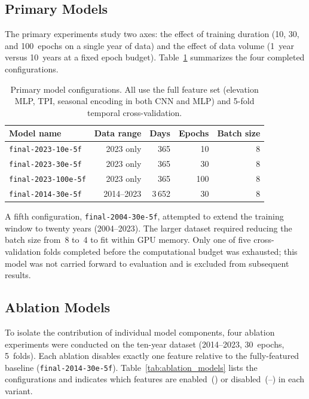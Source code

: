 \subsection{Primary Models}

The primary experiments study two axes: the effect of training duration (10, 30, and 100~epochs on a single year of data) and the effect of data volume (1~year versus 10~years at a fixed epoch budget). Table~\ref{tab:primary_models} summarizes the four completed configurations.

\begin{table}[ht]
\centering
\caption{Primary model configurations. All use the full feature set (elevation MLP, TPI, seasonal encoding in both CNN and MLP) and 5-fold temporal cross-validation.}
\label{tab:primary_models}
\begin{tabular}{@{}lrrrr@{}}
\toprule
\textbf{Model name} & \textbf{Data range} & \textbf{Days} & \textbf{Epochs} & \textbf{Batch size} \\
\midrule
\texttt{final-2023-10e-5f}  & 2023 only    & 365    & 10  & 8 \\
\texttt{final-2023-30e-5f}  & 2023 only    & 365    & 30  & 8 \\
\texttt{final-2023-100e-5f} & 2023 only    & 365    & 100 & 8 \\
\texttt{final-2014-30e-5f}  & 2014--2023   & 3\,652 & 30  & 8 \\
\bottomrule
\end{tabular}
\end{table}

A fifth configuration, \texttt{final-2004-30e-5f}, attempted to extend the training window to twenty years (2004--2023). The larger dataset required reducing the batch size from~8 to~4 to fit within GPU memory. Only one of five cross-validation folds completed before the computational budget was exhausted; this model was not carried forward to evaluation and is excluded from subsequent results.

\subsection{Ablation Models}

To isolate the contribution of individual model components, four ablation experiments were conducted on the ten-year dataset (2014--2023, 30~epochs, 5~folds). Each ablation disables exactly one feature relative to the fully-featured baseline (\texttt{final-2014-30e-5f}). Table~\ref{tab:ablation_models} lists the configurations and indicates which features are enabled~(\checkmark) or disabled~(--) in each variant.

